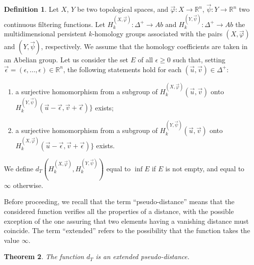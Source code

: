 \documentclass{amsart}
\newtheorem{theorem}{Theorem}[section]
\theoremstyle{definition}
\newtheorem{definition}[theorem]{Definition}
\theoremstyle{remark}
\newcommand{\R}{\mathbb{R}}
\numberwithin{equation}{section}
\begin{document}
\begin{definition}\label{distancedef}
Let $X$, $Y$ be two topological spaces, and $\vec\varphi:X\to\R^n$, $\vec\psi:Y\to\R^n$ two continuous filtering functions. Let $ H^{(X,\vec\varphi)}_k:\Delta^+\to Ab$ and $ H^{(Y,\vec\psi)}_k:\Delta^+\to Ab$ the multidimensional persistent $k$-homology groups associated with the pairs $(X,\vec\varphi)$ and $(Y,\vec\psi)$, respectively. We assume that the homology coefficients are taken in an Abelian group. Let us consider the set $E$ of all $\epsilon\ge 0$ such that, setting $\vec\epsilon=(\epsilon,\ldots,\epsilon)\in \mathbb{R}^n$, the following statements hold for each $(\vec u,\vec v)\in \Delta^+$:
\begin{enumerate}
\item a surjective homomorphism from a subgroup of $ H^{(X,\vec\varphi)}_k(\vec u,\vec v)$ onto $ H^{(Y,\vec\psi)}_k(\vec u-\vec \epsilon,\vec v+\vec \epsilon)\}$ exists;
\item a surjective homomorphism from a subgroup of $ H^{(Y,\vec\psi)}_k(\vec u,\vec v)$ onto $ H^{(X,\vec\varphi)}_k(\vec u-\vec \epsilon,\vec v+\vec \epsilon)\}$ exists.
\end{enumerate}
We define $d_T\left( H^{(X,\vec\varphi)}_k, H^{(Y,\vec\psi)}_k\right)$ equal to $\inf E$ if $E$ is not empty, and equal to $\infty$ otherwise.
\end{definition}


Before proceeding, we recall that the term ``pseudo-distance'' means that the considered function verifies all the properties of a distance, with the possible exception of the one assuring that two elements having a vanishing distance must coincide. The term ``extended'' refers to the possibility that the function takes the value $\infty$.

\begin{theorem}\label{isapseudodistance}
The function $d_T$ is an extended pseudo-distance.
\end{theorem}
\end{document}
